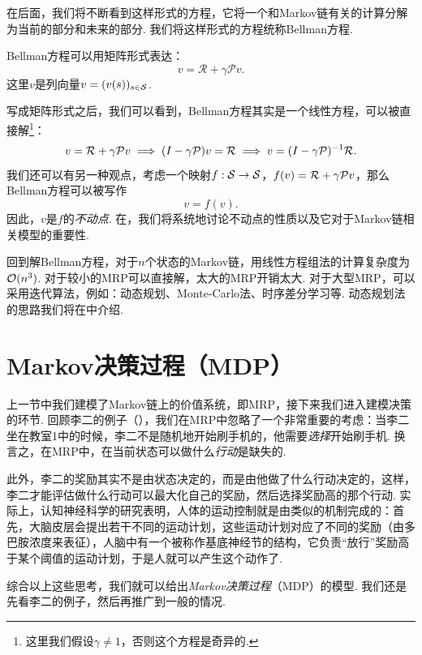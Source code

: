 在后面，我们将不断看到这样形式的方程，它将一个和Markov链有关的计算分解为当前的部分和未来的部分. 我们将这样形式的方程统称Bellman方程. 

Bellman方程可以用矩阵形式表达：
        \[v = \mathcal R + \gamma \mathcal P v.\]
这里$v$是列向量$v=(v(s))_{s\in\mathcal S}$.

写成矩阵形式之后，我们可以看到，Bellman方程其实是一个线性方程，可以被直接解\footnote{这里我们假设$\gamma\neq 1$，否则这个方程是奇异的.}：
\[
    v =\mathcal R + \gamma \mathcal P v \implies (I-\gamma \mathcal P)v = \mathcal R \implies v = (I-\gamma \mathcal P)^{-1} \mathcal R.
\]
我们还可以有另一种观点，考虑一个映射$f:\mathcal S\to \mathcal S$，$f(v)=\mathcal R + \gamma \mathcal P v$，那么Bellman方程可以被写作
\[v=f(v).\]
因此，$v$是$f$的\textit{不动点}. 在，我们将系统地讨论不动点的性质以及它对于Markov链相关模型的重要性.

回到解Bellman方程，对于$n$个状态的Markov链，用线性方程组法的计算复杂度为$\mathcal{O}(n^3)$. 对于较小的MRP可以直接解，太大的MRP开销太大. 对于大型MRP，可以采用迭代算法，例如：动态规划、Monte-Carlo法、时序差分学习等. 动态规划法的思路我们将在中介绍.

\section{Markov决策过程（MDP）}\label{sec:MDP}

上一节中我们建模了Markov链上的价值系统，即MRP，接下来我们进入建模决策的环节. 回顾李二的例子（），我们在MRP中忽略了一个非常重要的考虑：当李二坐在教室1中的时候，李二不是随机地开始刷手机的，他需要\textit{选择}开始刷手机. 换言之，在MRP中，在当前状态可以做什么\textit{行动}是缺失的. 

此外，李二的奖励其实不是由状态决定的，而是由他做了什么行动决定的，这样，李二才能评估做什么行动可以最大化自己的奖励，然后选择奖励高的那个行动. 实际上，认知神经科学的研究表明，人体的运动控制就是由类似的机制完成的：首先，大脑皮层会提出若干不同的运动计划，这些运动计划对应了不同的奖励（由多巴胺浓度来表征），人脑中有一个被称作基底神经节的结构，它负责“放行”奖励高于某个阈值的运动计划，于是人就可以产生这个动作了. 

综合以上这些思考，我们就可以给出\textit{Markov决策过程}（MDP）的模型. 我们还是先看李二的例子，然后再推广到一般的情况. 

